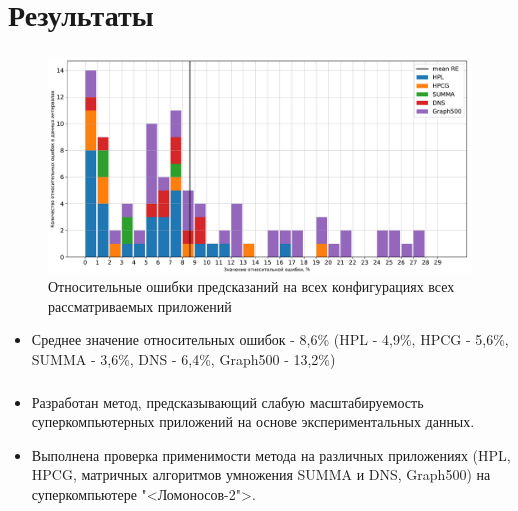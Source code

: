 \documentclass[unicode, t, 11pt]{beamer}%
\begin{document}
	\section{Результаты}
		\begin{frame}
			\frametitle{\insertsection}
			\footnotesize
			\begin{figure}
				\captionsetup{font=tiny, labelfont=tiny}
				\centering
				\includegraphics[width=\textwidth]{./images/RE_graph}
				\caption{Относительные ошибки предсказаний на всех конфигурациях всех рассматриваемых приложений}
			\end{figure}
			
			\begin{itemize}[label = \(\bullet\)]
			\item Среднее значение относительных ошибок - 8,6\% (HPL - 4,9\%, HPCG - 5,6\%, SUMMA - 3,6\%, DNS - 6,4\%, Graph500 - 13,2\%)

			\end{itemize}
		\end{frame}
		\begin{frame}
			\frametitle{\insertsection}
			\begin{itemize}[label = \(\bullet\)]
			\item Разработан метод, предсказывающий слабую масштабируемость суперкомпьютерных приложений на основе экспериментальных данных.
			\item Выполнена проверка применимости метода на различных приложениях (HPL, HPCG, матричных алгоритмов умножения SUMMA и DNS, Graph500) на суперкомпьютере "<Ломоносов-2">.
			\end{itemize}
		\end{frame}
\end{document}
